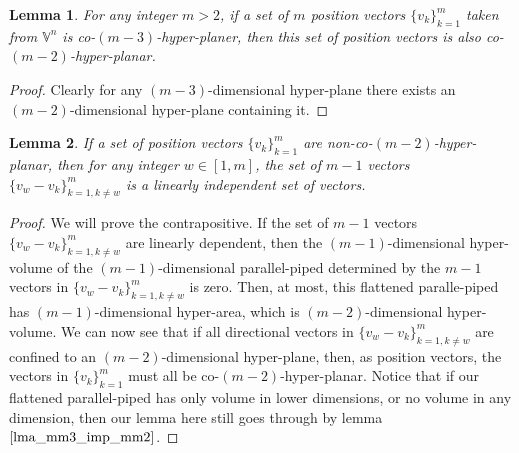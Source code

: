 \documentclass{article}
\newcommand{\V}{\mathbb{V}}
\newtheorem{lemma}{Lemma}[section]
\begin{document}
\begin{lemma}\label{lma_mm3_imp_mm2}
For any integer $m>2$, if a set of $m$ position vectors $\{v_k\}_{k=1}^m$
taken from $\V^n$ is co-$(m-3)$-hyper-planer, then this set of position vectors is
also co-$(m-2)$-hyper-planar.
\end{lemma}
\begin{proof}
Clearly for any $(m-3)$-dimensional hyper-plane there exists an $(m-2)$-dimensional
hyper-plane containing it.
\end{proof}

\begin{lemma}\label{lma_non_co_hyper_planar_imp_diff_set_lin_indep}
If a set of position vectors $\{v_k\}_{k=1}^m$ are non-co-$(m-2)$-hyper-planar,
then for any integer $w\in[1,m]$, the set of $m-1$ vectors $\{v_w-v_k\}_{k=1,k\neq w}^m$
is a linearly independent set of vectors.
\end{lemma}
\begin{proof}
We will prove the contrapositive.  If the set of $m-1$ vectors $\{v_w-v_k\}_{k=1,k\neq w}^m$
are linearly dependent, then the $(m-1)$-dimensional hyper-volume of the $(m-1)$-dimensional
parallel-piped determined by the $m-1$ vectors in $\{v_w-v_k\}_{k=1,k\neq w}^m$ is zero.
Then, at most, this flattened paralle-piped has $(m-1)$-dimensional hyper-area, which is
$(m-2)$-dimensional hyper-volume.  We can now see that if all directional vectors in
$\{v_w-v_k\}_{k=1,k\neq w}^m$ are confined to an $(m-2)$-dimensional hyper-plane, then,
as position vectors, the vectors in $\{v_k\}_{k=1}^m$ must all be co-$(m-2)$-hyper-planar.
Notice that if our flattened
parallel-piped has only volume in lower dimensions, or no volume in any dimension,
then our lemma here still goes through by lemma $\eqref{lma_mm3_imp_mm2}$.
\end{proof}
\end{document}
